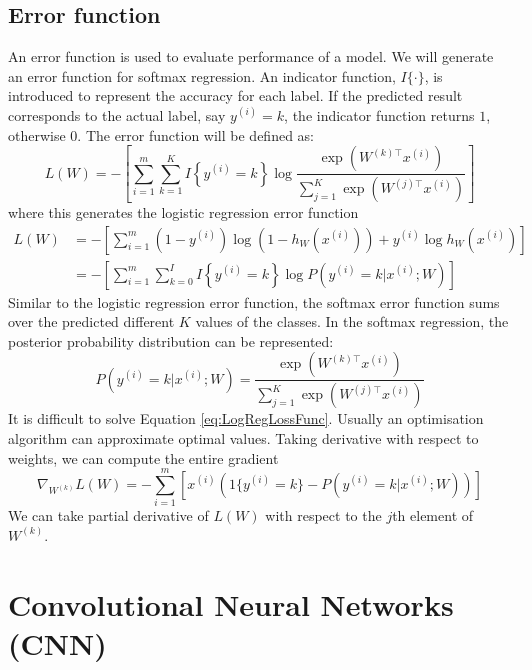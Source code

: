 \subsection{Error function}
An error function is used to evaluate performance of a model. We will generate an error function for softmax regression. An indicator function, $I\{\cdot\}$, is introduced to represent the accuracy for each label. If the predicted result corresponds to the actual label, say $y^{(i)} = k$, the indicator function returns $1$, otherwise $0$. The error function will be defined as:
\begin{equation}\label{eq:LogLossFunc}
L(W) = - \left[ \sum_{i=1}^{m} \sum_{k=1}^{K}  I\left\{y^{(i)} = k\right\} \log \frac{\exp(W^{(k)\top} x^{(i)})}{\sum_{j=1}^K \exp(W^{(j)\top} x^{(i)})}\right]
\end{equation}
where this generates the logistic regression error function
\begin{align}\label{eq:LogRegLossFunc}
L(W) &= - \left[ \sum_{i=1}^m   (1-y^{(i)}) \log (1-h_W(x^{(i)})) + y^{(i)} \log h_W(x^{(i)}) \right] \\
&= - \left[ \sum_{i=1}^{m} \sum_{k=0}^{I} I\left\{y^{(i)} = k\right\} \log P(y^{(i)} = k | x^{(i)} ; W) \right]
\end{align}
Similar to the logistic regression error function, the softmax error function sums over the predicted different $K$ values of the classes. In the softmax regression, the posterior probability distribution can be represented:
\begin{equation}\label{eq:PostProbDis}
P(y^{(i)} = k | x^{(i)} ; W) = \frac{\exp(W^{(k)\top} x^{(i)})}{\sum_{j=1}^K \exp(W^{(j)\top} x^{(i)}) }
\end{equation}
It is difficult to solve Equation \ref{eq:LogRegLossFunc}. Usually an optimisation algorithm can approximate optimal values. Taking derivative with respect to weights, we can compute the entire gradient 
\begin{equation}\label{eq:PartDer}
\nabla_{W^{(k)}} L(W) = - \sum_{i=1}^{m}{ \left[ x^{(i)} \left( 1\{ y^{(i)} = k\}  - P(y^{(i)} = k | x^{(i)}; W) \right) \right]  }
\end{equation}
We can take partial derivative of $L(W)$ with respect to the $j$th element of $W^{(k)}$.

\section{Convolutional Neural Networks (CNN)}

